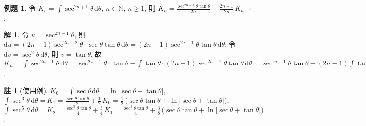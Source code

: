 \documentclass[12pt]{extarticle}
\newcommand{\ds}{\displaystyle}
\newcommand{\ie}{\;\Longrightarrow\;}
\theoremstyle{definition}
\newtheorem*{eg}{例題}
\newtheorem*{sol}{解}
\newtheorem*{rmk}{註}
\newcommand{\myline}{\noindent\makebox[\linewidth]{\rule{\paperwidth}{0.4pt}}}
\begin{document}
\begin{eg} 
  令 $\ds K_n = \int\!\sec^{2n+1}\!\theta\,\text{d}\theta$, $n\in\mathbb{N}$, $n\geqslant 1$, 則 $\ds K_n = \frac{\sec^{2n - 1}\theta\tan\theta}{2n} + \frac{2n - 1}{2n}\,K_{n - 1}$. 
\end{eg}

\begin{sol}
  令 $\ds u = \sec^{2n - 1}\!\theta$, 則 $\ds\text{d}u = (2n - 1)\sec^{2n - 2}\theta\cdot\sec\theta\tan\theta\,\text{d}\theta = (2n - 1)\sec^{2n - 1}\theta\tan\theta\,\text{d}\theta$; 令 $\ds\text{d}v = \sec^2\theta\,\text{d}\theta$, 則 $\ds v = \tan\theta$. 故 $\ds K_n = \int\!\sec^{2n + 1}\!\theta\,\text{d}\theta = \sec^{2n - 1}\!\theta\cdot\tan\theta - \int\!\tan\theta\cdot(2n - 1)\sec^{2n - 1}\theta\tan\theta\,\text{d}\theta = \sec^{2n -1}\!\theta\tan\theta - (2n - 1)\int\!\tan^2\theta\cdot\sec^{2n - 1}\theta\,\text{d}\theta = \sec^{2n - 1}\!\theta\tan\theta - (2n - 1)\int\!(\sec^2\theta - 1)\cdot\sec^{2n - 1}\!\theta\,\text{d}\theta = \sec^{2n - 1}\!\theta\tan\theta - (2n - 1)\int\!\sec^{2n + 1}\theta\,\text{d}\theta + (2n - 1)\int\!\sec^{2 n - 1}\!\theta\,\text{d}\theta \ie K_n = \sec^{2n - 1}\!\theta\tan\theta - (2n - 1)K_n + (2n - 1)K_{n - 1} \ie K_n = \frac{\sec^{2n - 1}\!\theta\tan\theta}{2n} + \frac{2n - 1}{2n}K_{n - 1}$.
\end{sol}

\begin{rmk}[使用例]
  $\ds K_0 = \int\!\sec\theta\,\text{d}\theta = \ln|\sec\theta + \tan\theta|$, $\ds\int\!\sec^3\!\theta\,\text{d}\theta = K_1 = \frac{\sec\theta\tan\theta}{2} + \frac{1}{2}\,K_0 = \frac{1}{2}\,\big(\sec\theta\tan\theta + \ln|\sec\theta + \tan\theta|\big)$, $\ds \int\!\sec^5\!\theta\,\text{d}\theta = K_2 = \frac{\sec^3\!\theta\tan\theta}{4} + \frac{3}{4}\,K_1 = \frac{\sec^3\!\theta\tan\theta}{4} + \frac{3}{8}\,\big(\sec\theta\tan\theta + \ln|\sec\theta + \tan\theta|\big)$. 
\end{rmk}

\myline
\end{document}
